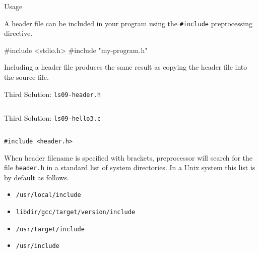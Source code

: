 \documentclass[compress]{beamer}
\begin{document}
\begin{slide}
	\begin{block}{Usage}

	A header file can be included in your program using the \texttt{\#include} preprocessing directive.

	\begin{terminal}
	#include <stdio.h>
	#include "my-program.h"
	\end{terminal}

	Including a header file produces the same result as copying the header file into the source file.

	\end{block}
\end{slide}

\begin{slide}
	\begin{block}{Third Solution: \texttt{ls09-header.h}}

	\inputminted[fontsize=\footnotesize, firstline=13, lastline=17, linenos]{c}{
		\resDirectory/header.h
	}

	\end{block}
\end{slide}

\begin{slide}
	\begin{block}{Third Solution: \texttt{ls09-hello3.c}}

	\inputminted[fontsize=\footnotesize, firstline=10, linenos]{c}{
		\resDirectory/hello3.c
	}

	\end{block}
\end{slide}

\begin{slide}
	\begin{block}{\texttt{\#include <header.h>}}

	When header filename is specified with brackets, preprocessor will search for the file \texttt{header.h} in a standard list of system directories.
	In a Unix system this list is by default as follows.

	\begin{itemize}
	\item[] \texttt{/usr/local/include}
	\item[] \texttt{libdir/gcc/target/version/include}
	\item[] \texttt{/usr/target/include}
	\item[] \texttt{/usr/include}
	\end{itemize}

	\end{block}
\end{slide}
\end{document}
